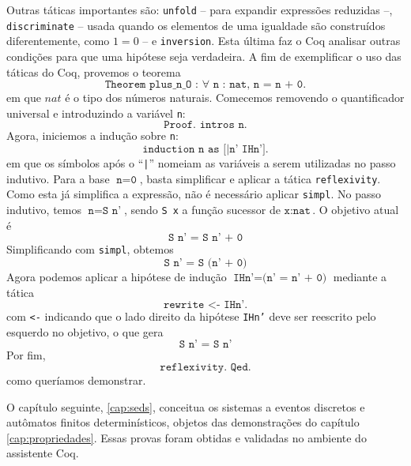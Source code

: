 Outras táticas importantes são: \texttt{unfold} -- para expandir expressões reduzidas --, \texttt{discriminate} -- usada quando os elementos de uma igualdade são construídos diferentemente, como $1 = 0$ -- e \texttt{inversion}. Esta última faz o Coq analisar outras condições para que uma hipótese seja verdadeira. A fim de exemplificar o uso das táticas do Coq, provemos o teorema $$\texttt{Theorem plus\_n\_O : $\forall$ n : nat, n = n + 0.}$$ em que $nat$ é o tipo dos números naturais. Comecemos removendo o quantificador universal e introduzindo a variável \texttt{n}: $$\texttt{Proof. intros n.}$$ Agora, iniciemos a indução sobre \texttt{n}: $$\texttt{induction n as [|n' IHn'].}$$ em que os símbolos após o ``\texttt{|}'' nomeiam as variáveis a serem utilizadas no passo indutivo. Para a base $\texttt{n} = \texttt{0}$, basta simplificar e aplicar a tática \texttt{reflexivity}. Como esta já simplifica a expressão, não é necessário aplicar \texttt{simpl}. No passo indutivo, temos $\texttt{n} = \texttt{S n'}$, sendo \texttt{S x} a função sucessor de $\texttt{x} : \texttt{nat}$. O objetivo atual é $$\texttt{S n' = S n' + 0}$$ Simplificando com \texttt{simpl}, obtemos $$\texttt{S n' = S (n' + 0)}$$ Agora podemos aplicar a hipótese de indução $\texttt{IHn'} = \texttt{(n' = n' + 0)}$ mediante a tática $$\texttt{rewrite <- IHn'.}$$ com \texttt{<-} indicando que o lado direito da hipótese \texttt{IHn'} deve ser reescrito pelo esquerdo no objetivo, o que gera $$\texttt{S n' = S n'}$$ Por fim, $$\texttt{reflexivity. Qed.}$$ como queríamos demonstrar.

O capítulo seguinte, \ref{cap:seds}, conceitua os sistemas a eventos discretos e autômatos finitos determinísticos, objetos das demonstrações do capítulo \ref{cap:propriedades}. Essas provas foram obtidas e validadas no ambiente do assistente Coq.